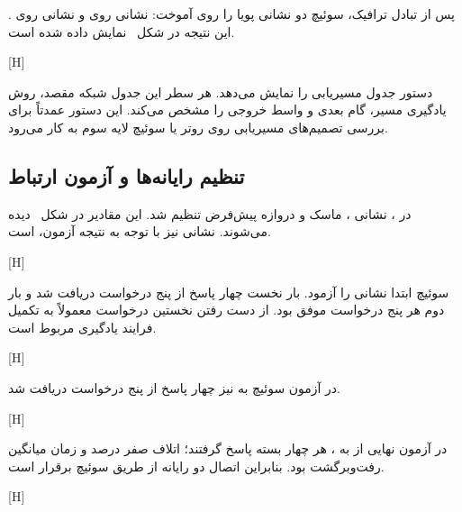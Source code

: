 پس از تبادل ترافیک، سوئیچ دو نشانی  پویا را روی  آموخت:
نشانی  روی  و نشانی 
روی . این نتیجه در شکل~
نمایش داده شده است.

[H]

دستور  جدول مسیریابی  را نمایش می‌دهد. هر سطر این جدول
شبکه مقصد، روش یادگیری مسیر، گام بعدی و واسط خروجی را مشخص می‌کند. این دستور عمدتاً
برای بررسی تصمیم‌های مسیریابی روی روتر یا سوئیچ لایه سوم به کار می‌رود.

\subsection{تنظیم رایانه‌ها و آزمون ارتباط}

در ، نشانی ، ماسک  و دروازه
پیش‌فرض  تنظیم شد. این مقادیر در
شکل~ دیده می‌شوند. نشانی  نیز با توجه به نتیجه
آزمون،  است.

[H]

سوئیچ ابتدا نشانی  را آزمود. بار نخست چهار پاسخ از پنج درخواست
دریافت شد و بار دوم هر پنج درخواست موفق بود. از دست رفتن نخستین درخواست معمولاً
به تکمیل فرایند یادگیری  مربوط است.

[H]

در آزمون سوئیچ به  نیز چهار پاسخ از پنج درخواست دریافت شد.

[H]

در آزمون نهایی از  به ، هر چهار بسته پاسخ گرفتند؛
اتلاف صفر درصد و زمان میانگین رفت‌وبرگشت  بود. بنابراین اتصال دو رایانه
از طریق سوئیچ برقرار است.

[H]

